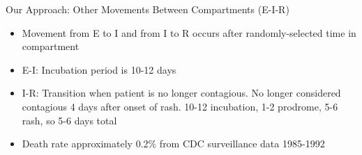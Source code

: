 \documentclass{beamer}
\begin{document}
\begin{frame}{Our Approach: Other Movements Between Compartments (E-I-R)}
\begin{itemize}
    \item Movement from E to I and from I to R occurs after randomly-selected time in compartment
    \item E-I: Incubation period is 10-12 days
    \item I-R: Transition when patient is no longer contagious. No longer considered contagious 4 days after onset of rash. 10-12 incubation, 1-2 prodrome, 5-6 rash, so 5-6 days total
    \item Death rate approximately 0.2\% from CDC surveillance data 1985-1992
\end{itemize}
\end{frame}
\end{document}
